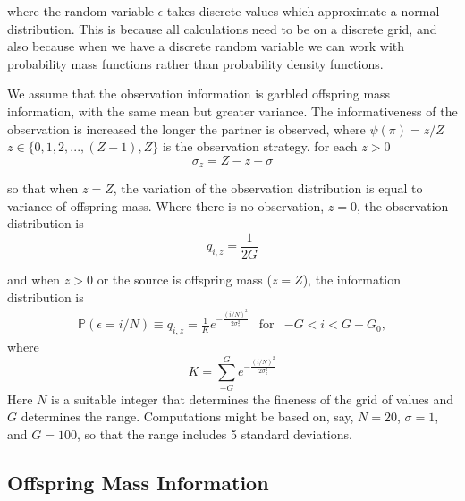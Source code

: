 \documentclass[10pt]{article}
\begin{document}
where the random variable $\epsilon$ takes discrete values which
approximate a normal distribution. This is because all calculations
need to be on a discrete grid, and also because when we have a discrete
random variable we can work with probability mass functions rather
than probability density functions.

We assume that the observation information is garbled offspring mass
information, with the same mean but greater variance. The informativeness
of the observation is increased the longer the partner is observed,
where $\psi(\pi)=z/Z$ $z\in\{0,1,2,...,(Z-1),Z\}$ is the observation
strategy. for each $z>0$
\begin{equation}
	\sigma_{z}=Z-z+\sigma\label{eq:-9-1}
\end{equation}

so that when $z=Z$, the variation of the observation distribution
is equal to variance of offspring mass. Where there is no observation,
$z=0$, the observation distribution is
\begin{equation}
	q_{i,z}=\frac{1}{2G}\label{eq:-10-1}
\end{equation}

and when $z>0$ or the source is offspring mass ($z=Z$), the information
distribution is
\begin{equation}
	\begin{array}{ccc}
		\mathbb{P}(\epsilon=i/N)\equiv q_{i,z}=\frac{1}{K}e^{-\frac{(i/N)^{2}}{2\sigma_{z}^{2}}} & \text{for} & -G<i<G+G_{0},\end{array}\label{eq:-2}
\end{equation}
where 
\[
K=\underset{-G}{\overset{G}{\boldsymbol{\sum}}}e^{-\frac{(i/N)^{2}}{2\sigma_{z}^{2}}}
\]
Here $N$ is a suitable integer that determines the fineness of the
grid of values and $G$ determines the range. Computations might be
based on, say, $N=20$, $\sigma=1$, and $G=100$, so that the range
includes 5 standard deviations. 

\subsection{Offspring Mass Information}
\end{document}
